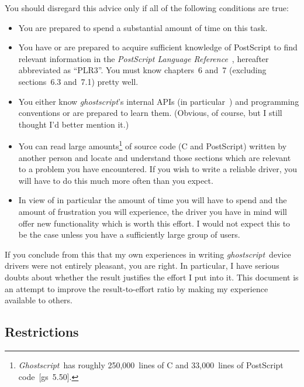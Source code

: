 \documentclass[twoside,a4paper]{article}
\newcommand{\gs}{\textit{ghostscript\/}}
\newcommand{\Gs}{\textit{Ghostscript\/}}
\begin{document}
You should disregard this advice only if all of the following conditions are
true:
\begin{itemize}
  \item You are prepared to spend a substantial amount of time on this task.
  \item You have or are prepared to acquire sufficient knowledge of PostScript
    to find relevant information in the
    {\it PostScript Language Reference\/}~\cite{PostScript3},
    hereafter abbreviated as ``PLR3''.
    You must know chapters~6 and~7 (excluding sections~6.3 and~7.1) pretty well.
  \item You either know \gs's internal APIs (in particular~\cite{Drivers6.01})
    and programming conventions or are prepared to learn them.
    (Obvious, of course, but I still thought I'd better mention it.)
  \item You can read large amounts\footnote{%
      \Gs\ has roughly 250,000~lines of C and 33,000~lines of PostScript
      code~[gs~5.50].}
    of source code (C and PostScript) written by another person and
    locate and understand those sections which are relevant to a problem you
    have encountered.
    If you wish to write a reliable driver,
    you will have to do this much more often than you expect.
  \item In view of in particular the amount of time you will have to spend and
    the amount of frustration you will experience,
    the driver you have in mind will offer new functionality which is worth
    this effort.
    I would not expect this to be the case unless you have a sufficiently large
    group of users.
\end{itemize}
If you conclude from this that my own experiences in writing \gs\ device
drivers were not entirely pleasant, you are right.
In particular,
I have serious doubts about whether the result justifies the effort I put into
it.
This document is an attempt to improve the result-to-effort ratio by making
my experience available to others.


\subsection{Restrictions}
\end{document}
